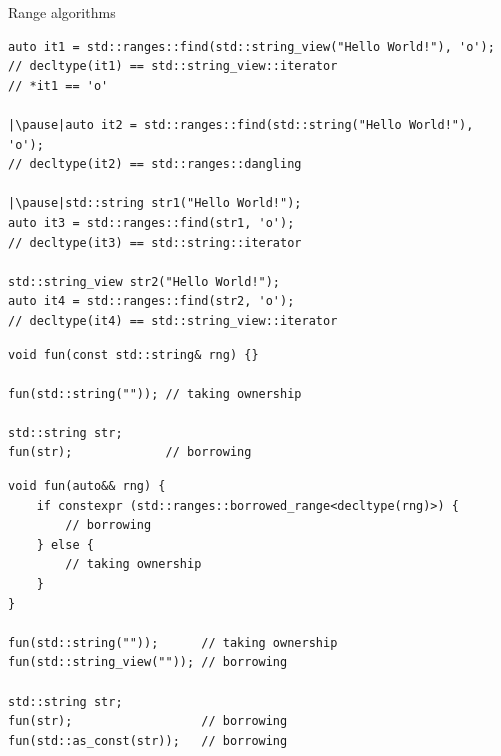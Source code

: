\documentclass[aspectratio=169]{beamer}
\begin{document}
\begin{frame}[fragile,c]{Range algorithms}
\begin{center}
\begin{verbatim}
auto it1 = std::ranges::find(std::string_view("Hello World!"), 'o');
// decltype(it1) == std::string_view::iterator
// *it1 == 'o'

|\pause|auto it2 = std::ranges::find(std::string("Hello World!"), 'o');
// decltype(it2) == std::ranges::dangling

|\pause|std::string str1("Hello World!");
auto it3 = std::ranges::find(str1, 'o');
// decltype(it3) == std::string::iterator

std::string_view str2("Hello World!");
auto it4 = std::ranges::find(str2, 'o');
// decltype(it4) == std::string_view::iterator
\end{verbatim}
\end{center}
\let\thefootnote\relax{}
\end{frame}

\begin{frame}[fragile]
\begin{center}
\begin{verbatim}
void fun(const std::string& rng) {}

fun(std::string("")); // taking ownership

std::string str;
fun(str);             // borrowing
\end{verbatim}
\end{center}
\end{frame}

\begin{frame}[fragile]
\begin{center}
\begin{verbatim}
void fun(auto&& rng) {
    if constexpr (std::ranges::borrowed_range<decltype(rng)>) {
        // borrowing
    } else {
        // taking ownership
    }
}

fun(std::string(""));      // taking ownership
fun(std::string_view("")); // borrowing

std::string str;
fun(str);                  // borrowing
fun(std::as_const(str));   // borrowing
\end{verbatim}
\end{center}
\let\thefootnote\relax{}
\end{frame}
\end{document}
